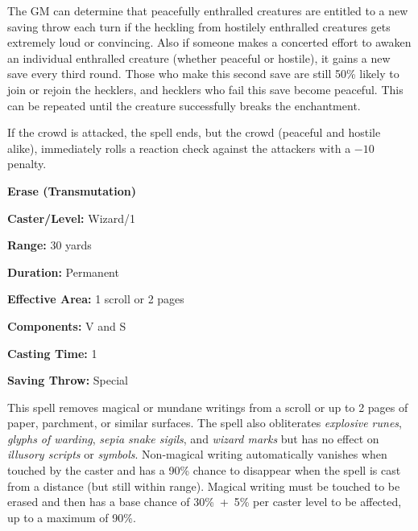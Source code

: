 \begin{multicols}{2}
The GM can determine that peacefully enthralled creatures are entitled to a new saving throw each turn if the heckling from hostilely enthralled creatures gets extremely loud or convincing.  Also if someone makes a concerted effort to awaken an individual enthralled creature (whether peaceful or hostile), it gains a new save every third round.  Those who make this second save are still 50\% likely to join or rejoin the hecklers, and hecklers who fail this save become peaceful.  This can be repeated until the creature successfully breaks the enchantment.

If the crowd is attacked, the spell ends, but the crowd (peaceful and hostile alike), immediately rolls a reaction check against the attackers with a $-10$ penalty.

\vspace{1em}

\noindent
\begin{minipage}{\columnwidth}

\noindent \textbf{Erase (Transmutation)}

\noindent \textbf{Caster/Level:} Wizard/1

\noindent \textbf{Range:} 30 yards

\noindent \textbf{Duration:} Permanent

\noindent \textbf{Effective Area:} 1 scroll or 2 pages

\noindent \textbf{Components:} V and S

\noindent \textbf{Casting Time:} 1

\noindent \textbf{Saving Throw:} Special

\end{minipage}

This spell removes magical or mundane writings from a scroll or up to 2 pages of paper, parchment, or similar surfaces.  The spell also obliterates \textit{explosive runes}, \textit{glyphs of warding}, \textit{sepia snake sigils}, and \textit{wizard marks} but has no effect on \textit{illusory scripts} or \textit{symbols}.  Non-magical writing automatically vanishes when touched by the caster and has a 90\% chance to disappear when the spell is cast from a distance (but still within range).  Magical writing must be touched to be erased and then has a base chance of 30\%~+~5\% per caster level to be affected, up to a maximum of 90\%.

\vspace{1em}

\noindent
\begin{minipage}{\columnwidth}


\end{minipage}
\end{multicols}
